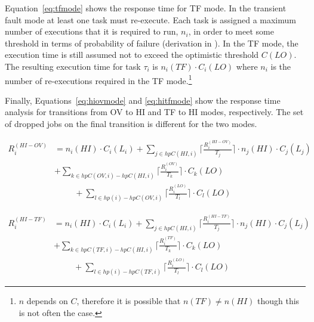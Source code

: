 	Equation~\ref{eq:tfmode} shows the response time for TF mode. 
	In the transient fault mode at least one task must re-execute. 
	Each task is assigned a maximum number of executions that it is required to run, $n_i$, in order to meet some threshold in terms of probability of failure (derivation in \cite{albayati2016modes}). 
	In the TF mode, the execution time is still assumed not to exceed the optimistic threshold $C(LO)$. 
	The resulting execution time for task $\tau_i$ is $n_i(TF) \cdot C_i(LO)$ where $n_i$ is the number of re-executions required in the TF mode.\footnote{$n$ depends on $C$, therefore it is possible that $n(TF) \ne n(HI)$ though this is not often the case.}

	Finally, Equations~\ref{eq:hiovmode} and \ref{eq:hitfmode} show the response time analysis for transitions from OV to HI and TF to HI modes, respectively. The set of dropped jobs on the final transition is different for the two modes.





\begin{equation}\label{eq:hiovmode}
\begin{aligned}
R_i^{(HI-OV)} & = n_i(HI) \cdot C_i(L_i) 
  +\sum_{j \in hpC(HI,i)}\Big\lceil\frac{R_i^{(HI-OV)}}{T_j}\Big\rceil \cdot n_j(HI) \cdot C_j(L_j) \\
&  +\sum_{k \in hpC(OV,i)-hpC(HI,i)}\Big\lceil\frac{R_i^{(OV)}}{T_k}\Big\rceil \cdot C_k(LO) \\
& \hspace{1cm}  +\sum_{l \in hp(i)-hpC(OV,i)}\Big\lceil\frac{R_i^{(LO)}}{T_l}\Big\rceil \cdot C_l(LO)
\end{aligned}
\end{equation}

\begin{equation}\label{eq:hitfmode}
\begin{aligned}
R_i^{(HI-TF)} & = n_i(HI) \cdot C_i(L_i)
  +\sum_{j \in hpC(HI,i)}\Big\lceil\frac{R_i^{(HI-TF)}}{T_j}\Big\rceil \cdot n_j(HI) \cdot C_j(L_j) \\
&  +\sum_{k \in hpC(TF,i)-hpC(HI,i)}\Big\lceil\frac{R_i^{(TF)}}{T_k}\Big\rceil \cdot C_k(LO) \\
& \hspace{1cm}  +\sum_{l \in hp(i)-hpC(TF,i)}\Big\lceil\frac{R_i^{(LO)}}{T_l}\Big\rceil \cdot C_l(LO)
\end{aligned}
\end{equation}




